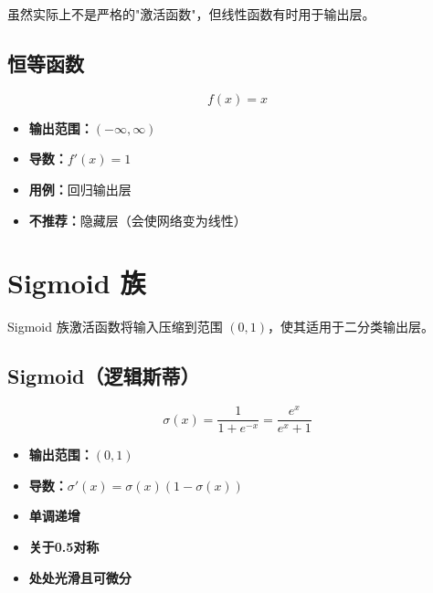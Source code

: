 虽然实际上不是严格的"激活函数"，但线性函数有时用于输出层。

\subsection{恒等函数}

\begin{equation}
f(x) = x
\end{equation}

\begin{itemize}
    \item \textbf{输出范围：}$(-\infty, \infty)$
    \item \textbf{导数：}$f'(x) = 1$
    \item \textbf{用例：}回归输出层
    \item \textbf{不推荐：}隐藏层（会使网络变为线性）
\end{itemize}

\section{Sigmoid 族}

Sigmoid 族激活函数将输入压缩到范围 $(0, 1)$，使其适用于二分类输出层。

\subsection{Sigmoid（逻辑斯蒂）}

\begin{equation}
\sigma(x) = \frac{1}{1 + e^{-x}} = \frac{e^x}{e^x + 1}
\end{equation}

\begin{properties}[Sigmoid的性质]
\begin{itemize}
    \item \textbf{输出范围：}$(0, 1)$
    \item \textbf{导数：}$\sigma'(x) = \sigma(x)(1 - \sigma(x))$
    \item \textbf{单调递增}
    \item \textbf{关于0.5对称}
    \item \textbf{处处光滑且可微分}
\end{itemize}
\end{properties}

